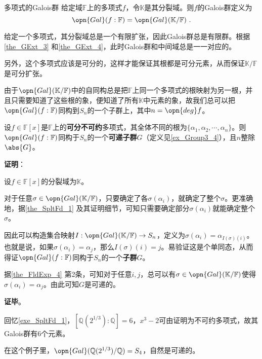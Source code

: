 \begin{definition}{多项式的Galois群}
给定域$\mathbb{F}$上的多项式$f$，令$\mathbb{K}$是其分裂域。则$f$的Galois群定义为
\begin{equation}
\opn{Gal}(f:\mathbb{F})=\opn{Gal}(\mathbb{K}/\mathbb{F})~.
\end{equation}
\end{definition}

给定一个多项式，其分裂域总是一个有限扩张，因此Galois群总是有限群。根据\autoref{the_GExt_3} 和\autoref{the_GExt_4}，此时Galois群和中间域总是一一对应的。

另外，这个多项式应该是可分的，这样才能保证其根都是可分元素，从而保证$\mathbb{K}/\mathbb{F}$是可分扩张。

由于$\opn{Gal}(\mathbb{K}/\mathbb{F})$中的自同构总是把$\mathbb{F}$上同一个多项式的根映射为另一根，并且只需要知道了这些根的象，便知道了所有$\mathbb{K}$中元素的象，故我们总可以把$\opn{Gal}(f:\mathbb{F})$同构到$S_n$的一个子群上，其中$n=\opn{deg}f$。

\begin{theorem}{}\label{the_PlyRtS_1}
设$f\in\mathbb{F}[x]$是$\mathbb{F}$上的\textbf{可分不可约}多项式，其全体不同的根为$\{\alpha_1, \alpha_2, \cdots, \alpha_n\}$。则$\opn{Gal}(f:\mathbb{F})$同构于$S_n$的一个\textbf{可递子群}$G$（定义见\autoref{ex_Group3_4}），且$n$整除$\abs{G}$。
\end{theorem}

\textbf{证明}：

设$f\in\mathbb{F}[x]$的分裂域为$\mathbb{K}$。

对于任意$\sigma\in\opn{Gal}(\mathbb{K}/\mathbb{F})$，只要确定了各$\sigma(\alpha_i)$，就确定了整个$\sigma$。更准确地，据\autoref{the_SpltFd_1} 及其证明细节，可知只需要确定部分$\sigma(\alpha_i)$就能确定整个$\sigma$。

因此可以构造集合映射$I:\opn{Gal}(\mathbb{K}/\mathbb{F})\to S_n$，定义为$\sigma(\alpha_i)=\alpha_{I(\sigma)(i)}$。也就是说，如果$\sigma(\alpha_i)=\alpha_j$，那么$I(\sigma)(i)=j$。易验证这是个单同态，从而得证$\opn{Gal}(f:\mathbb{F})$同构于$S_n$的一个\textbf{子群}$G$。

据\autoref{the_FldExp_4} 第2条，可知对于任意$i, j$，总可以有$\sigma\in\opn{Gal}(\mathbb{K}/\mathbb{F})$使得$\sigma(\alpha_i)=\alpha_j$。由此可知$G$是可递的。

\textbf{证毕}。


\begin{example}{}
回忆\autoref{exe_SpltFd_1}，$[\mathbb{Q}(2^{1/3}):\mathbb{Q}]=6$，$x^3-2$可由证明为不可约多项式，故其Galois群有6个元素。

在这个例子里，$\opn{Gal}(\mathbb{Q}(2^{1/3})/\mathbb{Q})=S_4$，自然是可递的。
\end{example}


